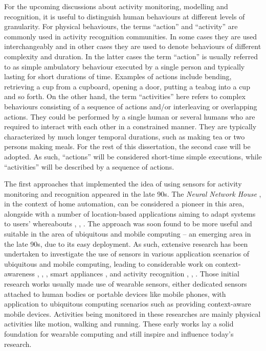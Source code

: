 For the upcoming discussions about activity monitoring, modelling and recognition, it is useful to distinguish human behaviours at different levels of granularity. For physical behaviours, the terms “action” and “activity” are commonly used in activity recognition communities. In some cases they are used interchangeably and in other cases they are used to denote behaviours of different complexity and duration. In the latter cases the term “action” is usually referred to as simple ambulatory behaviour executed by a single person and typically lasting for short durations of time. Examples of actions include bending, retrieving a cup from a cupboard, opening a door, putting a teabag into a cup and so forth. On the other hand, the term “activities” here refers to complex behaviours consisting of a sequence of actions and/or interleaving or overlapping actions. They could be performed by a single human or several humans who are required to interact with each other in a constrained manner. They are typically characterized by much longer temporal durations, such as making tea or two persons making meals. For the rest of this dissertation, the second case will be adopted. As such, ``actions'' will be considered short-time simple executions, while ``activities'' will be described by a sequence of actions.

The first approaches that implemented the idea of using sensors for activity monitoring and recognition appeared in the late 90s. The \textit{Neural Network House} \cite{Mozer1998}, in the context of home automation, can be considered a pioneer in this area, alongside with a number of location-based applications aiming to adapt systems to users’ whereabouts \cite{Leonhardt1998}, \cite{Golding1999}, \cite{Ward1997}. The approach was soon found to be more useful and suitable in the area of ubiquitous and mobile computing – an emerging area in the late 90s, due to its easy deployment. As such, extensive research has been undertaken to investigate the use of sensors in various application scenarios of ubiquitous and mobile computing, leading to considerable work on context-awareness \cite{Schmidt1999}, \cite{Randell2000}, \cite{Gellersen2002}, smart appliances \cite{Schmidt2001}, \cite{Laerhoven2001} and activity recognition \cite{Laerhoven2001a}, \cite{Foerster2000}, \cite{Lee2002}. Those initial research works usually made use of wearable sensors, either dedicated sensors attached to human bodies or portable devices like mobile phones, with application to ubiquitous computing scenarios such as providing context-aware mobile devices. Activities being monitored in these researches are mainly physical activities like motion, walking and running. These early works lay a solid foundation for wearable computing and still inspire and influence today’s research.

